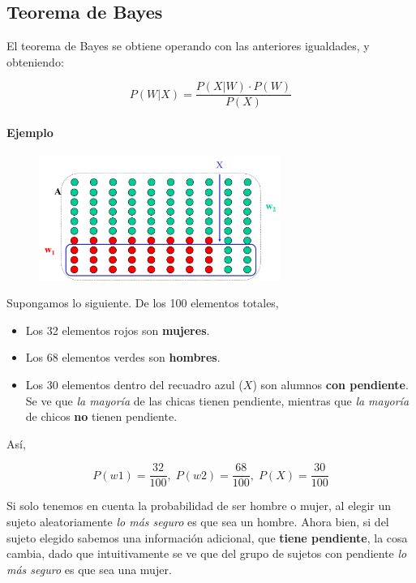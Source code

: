 \documentclass[11pt]{scrartcl}
\begin{document}
\subsection{Teorema de Bayes}

El teorema de Bayes se obtiene operando con las anteriores igualdades, y
obteniendo:

\[
P(W|X) = \frac{P(X|W) \cdot P(W)}{P(X)}
\]

\paragraph{Ejemplo}

\begin{figure}[h!]
  \centering
  \includegraphics[width=0.7\textwidth]{img/bayes2}
\end{figure}

Supongamos lo siguiente. De los 100 elementos totales,
\begin{itemize}
\item Los 32 elementos rojos son \textbf{mujeres}.
\item Los 68 elementos verdes son \textbf{hombres}.
\item Los 30 elementos dentro del recuadro azul ($X$) son alumnos \textbf{con
    pendiente}. Se ve que \textit{la mayoría} de las chicas tienen pendiente,
  mientras que \textit{la mayoría} de chicos \textbf{no} tienen pendiente.
\end{itemize}

Así, 

\[
P(w1) = \frac{32}{100} ,\;
P(w2) = \frac{68}{100} ,\;
P(X) = \frac{30}{100} 
\]

Si solo tenemos en cuenta la probabilidad de ser hombre o mujer, al elegir un
sujeto aleatoriamente \textit{lo más seguro} es que sea un hombre. Ahora bien,
si del sujeto elegido sabemos una información adicional, que \textbf{tiene
  pendiente}, la cosa cambia, dado que intuitivamente se ve que del grupo de
sujetos con pendiente \textit{lo más seguro} es que sea una mujer.
\end{document}
